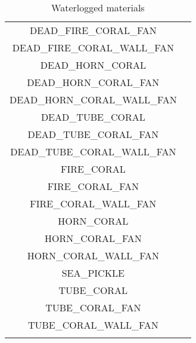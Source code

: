 \begin{longtable}{ |c|c| }
	DEAD\_FIRE\_CORAL\_FAN & \cmark \\
	DEAD\_FIRE\_CORAL\_WALL\_FAN & \cmark \\
	DEAD\_HORN\_CORAL & \cmark \\
	DEAD\_HORN\_CORAL\_FAN & \cmark \\
	DEAD\_HORN\_CORAL\_WALL\_FAN & \cmark \\
	DEAD\_TUBE\_CORAL & \cmark \\
	DEAD\_TUBE\_CORAL\_FAN & \cmark \\
	DEAD\_TUBE\_CORAL\_WALL\_FAN & \cmark \\
	FIRE\_CORAL & \cmark \\
	FIRE\_CORAL\_FAN & \cmark \\
	FIRE\_CORAL\_WALL\_FAN & \cmark \\
	HORN\_CORAL & \cmark \\
	HORN\_CORAL\_FAN & \cmark \\
	HORN\_CORAL\_WALL\_FAN & \cmark \\
	SEA\_PICKLE & \cmark \\
	TUBE\_CORAL & \cmark \\
	TUBE\_CORAL\_FAN & \cmark \\
	TUBE\_CORAL\_WALL\_FAN & \cmark \\
	\hline
	\caption{Waterlogged materials}
\end{longtable}


